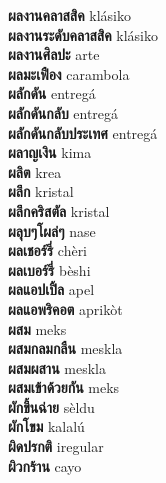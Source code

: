 \textbf{ ผลงานคลาสสิค  } klásiko \\
\textbf{ ผลงานระดับคลาสสิค  } klásiko \\
\textbf{ ผลงานศิลปะ  } arte \\
\textbf{ ผลมะเฟือง  } carambola \\
\textbf{ ผลักดัน  } entregá \\
\textbf{ ผลักดันกลับ  } entregá \\
\textbf{ ผลักดันกลับประเทศ  } entregá \\
\textbf{ ผลาญเงิน  } kima \\
\textbf{ ผลิต  } krea \\
\textbf{ ผลึก  } kristal \\
\textbf{ ผลึกคริสตัล  } kristal \\
\textbf{ ผลุบๆโผล่ๆ  } nase \\
\textbf{ ผลเชอร์รี่  } chèri \\
\textbf{ ผลเบอร์รี่  } bèshi \\
\textbf{ ผลแอปเปิ้ล  } apel \\
\textbf{ ผลแอพริคอต  } aprikòt \\
\textbf{ ผสม  } meks \\
\textbf{ ผสมกลมกลืน  } meskla \\
\textbf{ ผสมผสาน  } meskla \\
\textbf{ ผสมเข้าด้วยกัน  } meks \\
\textbf{ ผักขึ้นฉ่าย  } sèldu \\
\textbf{ ผักโขม  } kalalú \\
\textbf{ ผิดปรกติ  } iregular \\
\textbf{ ผิวกร้าน  } cayo \\
